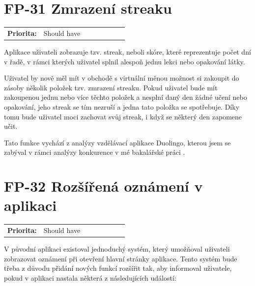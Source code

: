 \section{FP-31 Zmrazení streaku}\label{sec:fp-streak-freeze}

\begin{tabular}{lp{0.7\linewidth}}
    \textbf{Priorita:} & Should have \\
\end{tabular}

Aplikace uživateli zobrazuje tzv. streak, neboli skóre, které reprezentuje počet dní v řadě, v rámci kterých uživatel splnil alespoň jednu lekci nebo opakování látky.

Uživatel by nově měl mít v obchodě s virtuální měnou možnost si zakoupit do zásoby několik položek tzv. zmrazení streaku. Pokud uživatel bude mít zakoupenou jednu nebo více těchto položek a nesplní daný den žádné učení nebo opakování, jeho streak se tím nezruší a jedna tato položka se spotřebuje. Díky tomu bude uživatel moci zachovat svůj streak, i když se některý den zapomene učit.

Tato funkce vychází z analýzy vzdělávací aplikace Duolingo, kterou jsem se zabýval v rámci analýzy konkurence v mé bakalářské práci \cite{Jenicek2024BachelorThesis}.

\section{FP-32 Rozšířená oznámení v aplikaci}\label{sec:fp-extended-notifications} 

\begin{tabular}{lp{0.7\linewidth}}
    \textbf{Priorita:} & Should have \\
\end{tabular}

V původní aplikaci existoval jednoduchý systém, který umožňoval uživateli zobrazovat oznámení při otevření hlavní stránky aplikace. Tento systém bude třeba z důvodu přidání nových funkcí rozšířit tak, aby informoval uživatele, pokud v aplikaci nastala některá z následujících událostí:

